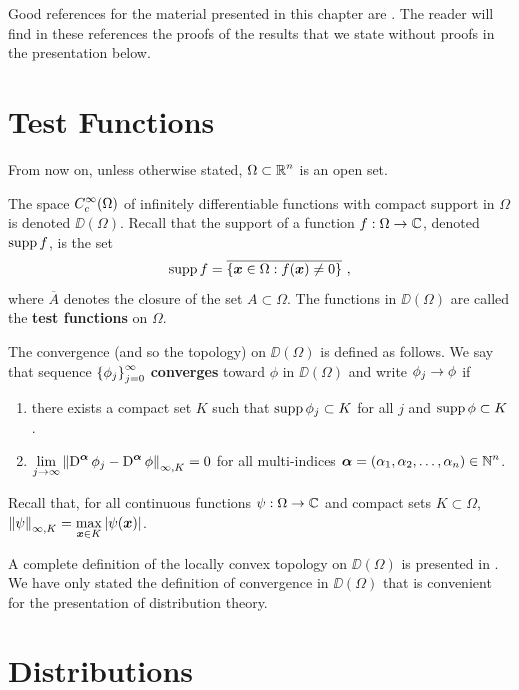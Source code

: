 Good references for the material presented in this chapter are
\cite{ReeSim,RuFA}.  The reader will find in these references the proofs of
the results that we state without proofs in the presentation below.

\section{Test Functions} \label{SectTestFnct}

From now on, unless otherwise stated, $\displaystyle \Omega \subset \mathbb{R}^n$ is an
open set.

The space $\displaystyle C_c^\infty(\Omega)$ of infinitely
differentiable functions with compact support in $\Omega$ is denoted
$\DD(\Omega)$.
Recall that the support of a function $f:\Omega \rightarrow \mathbb{C}$, denoted
$\operatorname{supp} f$, is the set
\[
\operatorname{supp} f = \overline{\left\{ {\bm{x}} \in \Omega : f({\bm{x}}) \neq 0 \right\}} \ ,
\]
where $\overline{A}$ denotes the closure of the set $A\subset \Omega$.
The functions in $\DD(\Omega)$ are called the
{\bfseries test functions} on $\Omega$. 

The convergence (and so the topology) on $\DD(\Omega)$ is defined as
follows.  We say that sequence
$\displaystyle \left\{\phi_j\right\}_{j=0}^\infty$
{\bfseries converges}
toward $\phi$ in $\DD(\Omega)$ and write
$\displaystyle \phi_j \rightarrow \phi$ if
\begin{enumerate}
\item there exists a compact set $K$ such that
$\operatorname{supp} \phi_j \subset K$ for all $j$ and $\operatorname{supp} \phi \subset K$.
\item $\displaystyle \lim_{j\rightarrow \infty}
\left\| \operatorname{D}^{{\bm{\alpha}}} \phi_j
- \operatorname{D}^{{\bm{\alpha}}} \phi\right\|_{\infty,K} =0$
for all multi-indices
$\displaystyle {\bm{\alpha}} = (\alpha_1,\alpha_2, \ldots, \alpha_n) \in \mathbb{N}^n$.
\end{enumerate}
Recall that, for all continuous functions $\psi:\Omega \to \mathbb{C}$ and
compact sets $K\subset \Omega$,
$\displaystyle \left\| \psi \right\|_{\infty,K} =
\max_{{\bm{x}}\in K} \left| \psi({\bm{x}}) \right|$.

A complete definition of the locally convex topology on $\DD(\Omega)$
is presented in \cite{RuFA,ReeSim}.  We have only stated the definition of
convergence in $\DD(\Omega)$ that is convenient for the presentation
of distribution theory.

\section{Distributions}

